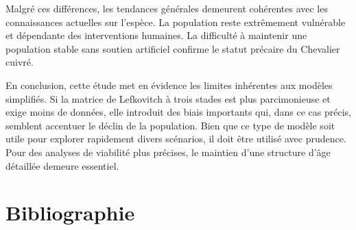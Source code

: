 \documentclass[9pt,twocolumn,twoside,]{pnas-new}
\begin{document}
Malgré ces différences, les tendances générales demeurent cohérentes
avec les connaissances actuelles sur l'espèce. La population reste
extrêmement vulnérable et dépendante des interventions humaines. La
difficulté à maintenir une population stable sans soutien artificiel
confirme le statut précaire du Chevalier cuivré.

En conclusion, cette étude met en évidence les limites inhérentes aux
modèles simplifiés. Si la matrice de Lefkovitch à trois stades est plus
parcimonieuse et exige moins de données, elle introduit des biais
importants qui, dans ce cas précis, semblent accentuer le déclin de la
population. Bien que ce type de modèle soit utile pour explorer
rapidement divers scénarios, il doit être utilisé avec prudence. Pour
des analyses de viabilité plus précises, le maintien d'une structure
d'âge détaillée demeure essentiel.

\section*{Bibliographie}\label{bibliographie}

\pnasbreak
\end{document}
